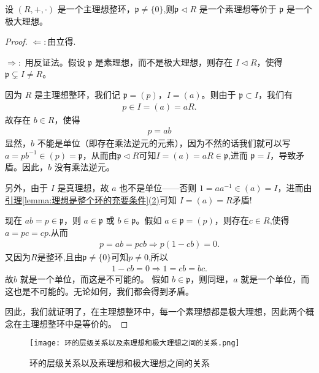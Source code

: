 \documentclass[../../main.tex]{subfiles}
\begin{document}
\begin{proposition}[主理想整环中的素理想与极大理想等价]\label{proposition:主理想整环中的非零素理想与极大理想等价}
设 $(R, +, \cdot)$ 是一个主理想整环，$\mathfrak{p} \neq \{0\}$,则$\mathfrak{p} \lhd R$ 是一个素理想等价于 $\mathfrak{p}$ 是一个极大理想。
\end{proposition}
\begin{proof}
$\Leftarrow:$由立得.

$\Rightarrow:$
用反证法。假设 $\mathfrak{p}$ 是素理想，而不是极大理想，则存在 $I \lhd R$，使得 $\mathfrak{p} \subsetneq I \neq R$。

因为 $R$ 是主理想整环，我们记 $\mathfrak{p} = (p)$，$I = (a)$。则由于 $\mathfrak{p} \subset I$，我们有
\begin{align*}
p \in I = (a)=aR.
\end{align*}
故存在 $b \in R$，使得
\begin{align*}
p = ab
\end{align*}
显然，$b$ 不能是单位（即存在乘法逆元的元素），因为不然的话我们就可以写 $a = pb^{-1}\in (p)=\mathfrak{p}$，从而由$\mathfrak{p}\lhd R$可知$I=(a)=aR\in \mathfrak{p}$,进而 $\mathfrak{p} = I$，导致矛盾。因此，$b$ 没有乘法逆元。

另外，由于 $I$ 是真理想，故 $a$ 也不是单位——否则 $1=aa^{-1} \in (a)=I$，进而由\hyperref[lemma:理想是整个环的充要条件]{引理\ref{lemma:理想是整个环的充要条件}(2)}可知 $I=(a) = R$矛盾!

现在 $ab=p \in \mathfrak{p}$，则 $a \in \mathfrak{p}$ 或 $b \in \mathfrak{p}$。假如 $a \in \mathfrak{p} = (p)$，则存在$c\in R$,使得$a=pc=cp$.从而
\begin{align*}
p=ab=pcb\Rightarrow p(1-cb)=0.
\end{align*}
又因为$R$是整环,且由$\mathfrak{p}\ne\{0\}$可知$p\ne0$,所以
\begin{align*}
1-cb=0\Rightarrow 1=cb=bc.
\end{align*}
故$b$ 就是一个单位，而这是不可能的。
假如 $b \in \mathfrak{p}$，则同理，$a$ 就是一个单位，而这也是不可能的。无论如何，我们都会得到矛盾。

因此，我们就证明了，在主理想整环中，每一个素理想都是极大理想，因此两个概念在主理想整环中是等价的。 
\end{proof}

\begin{figure}[H]
\centering
\texttt{[image: 环的层级关系以及素理想和极大理想之间的关系.png]}
\caption{环的层级关系以及素理想和极大理想之间的关系}
\label{figure:环的层级关系以及素理想和极大理想之间的关系}
\end{figure}
\end{document}
